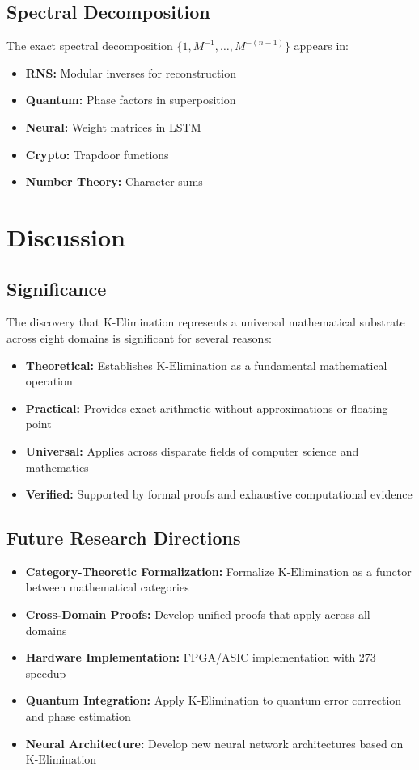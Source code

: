 \documentclass[11pt,letterpaper]{article}
\newcommand{\KElim}{\text{K-Elimination}}
\begin{document}
\subsection{Spectral Decomposition}

The exact spectral decomposition \(\{1, M^{-1}, \ldots, M^{-(n-1)}\}\) appears in:

\begin{itemize}
\item {\bf RNS:} Modular inverses for reconstruction
\item {\bf Quantum:} Phase factors in superposition
\item {\bf Neural:} Weight matrices in LSTM
\item {\bf Crypto:} Trapdoor functions
\item {\bf Number Theory:} Character sums
\end{itemize}

\newpage

\section{Discussion}
\label{sec:discussion}

\subsection{Significance}

The discovery that \(\KElim\) represents a universal mathematical substrate across eight domains is significant for several reasons:

\begin{itemize}
\item {\bf Theoretical:} Establishes \(\KElim\) as a fundamental mathematical operation
\item {\bf Practical:} Provides exact arithmetic without approximations or floating point
\item {\bf Universal:} Applies across disparate fields of computer science and mathematics
\item {\bf Verified:} Supported by formal proofs and exhaustive computational evidence
\end{itemize}

\subsection{Future Research Directions}

\begin{itemize}
\item {\bf Category-Theoretic Formalization:} Formalize \(\KElim\) as a functor between mathematical categories
\item {\bf Cross-Domain Proofs:} Develop unified proofs that apply across all domains
\item {\bf Hardware Implementation:} FPGA/ASIC implementation with 273\times{} speedup
\item {\bf Quantum Integration:} Apply \(\KElim\) to quantum error correction and phase estimation
\item {\bf Neural Architecture:} Develop new neural network architectures based on \(\KElim\)
\end{itemize}
\end{document}
